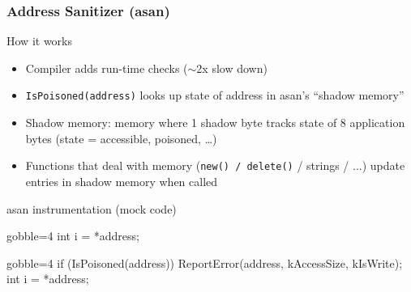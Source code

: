 \begin{frame}[fragile]
  \frametitle{Address Sanitizer (asan)}
  \begin{block}{How it works}
    \begin{itemize}
      \item Compiler adds run-time checks ($\sim$2x slow down)
      \item \texttt{IsPoisoned(address)} looks up state of address in asan's ``shadow memory''
      \item Shadow memory: memory where 1 shadow byte tracks state of 8 application bytes (state = accessible, poisoned, \ldots)
      \item Functions that deal with memory (\texttt{new() / delete()} / strings / ...) update entries in shadow memory when called
    \end{itemize}
  \end{block}
  \begin{exampleblock}{asan instrumentation (mock code)}
    \begin{overprint}
      \vfill
      \begin{cppcode*}{gobble=4}
        int i = *address;
      \end{cppcode*}
      \vfill
      \begin{cppcode*}{gobble=4}
        if (IsPoisoned(address)) {
          ReportError(address, kAccessSize, kIsWrite);
        }
        int i = *address;
      \end{cppcode*}
    \end{overprint}
  \end{exampleblock}
\end{frame}


